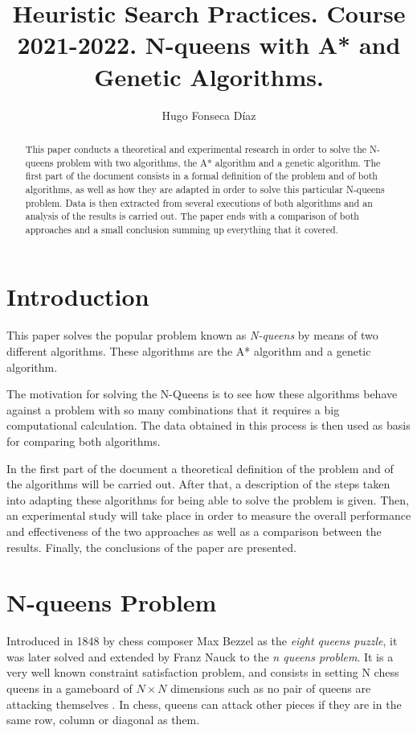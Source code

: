 \documentclass[]{llncs}
\begin{document}
\title{Heuristic Search Practices. Course 2021-2022. N-queens with A* and Genetic Algorithms.}
\author{Hugo Fonseca Díaz\\ }
\maketitle
\begin{abstract}
    This paper conducts a theoretical and experimental research in order to solve the N-queens problem with two algorithms, the A* algorithm and a genetic algorithm. The first part of the document consists in a formal definition of the problem and of both algorithms, as well as how they are adapted in order to solve this particular N-queens problem. Data is then extracted from several executions of both algorithms and an analysis of the results is carried out. The paper ends with a comparison of both approaches and a small conclusion summing up everything that it covered. 
\end{abstract}
\section{Introduction}\label{introduction}
This paper solves the popular problem known as \textit{N-queens} by means of two different algorithms. These algorithms are the A* algorithm and a genetic algorithm. 

The motivation for solving the N-Queens is to see how these algorithms behave against a problem with so many combinations that it requires a big computational calculation. The data obtained in this process is then used as basis for comparing both algorithms.

In the first part of the document a theoretical definition of the problem and of the algorithms will be carried out. After that, a description of the steps taken into adapting these algorithms for being able to solve the problem is given. Then, an experimental study will take place in order to measure the overall performance and effectiveness of the two approaches as well as a comparison between the results. Finally, the conclusions of the paper are presented.
\section{N-queens Problem}\label{nqueens_problem}
Introduced in 1848 by chess composer Max Bezzel as the \textit{eight queens puzzle}, it was later solved and extended by Franz Nauck to the \textit{n queens problem}. It is a very well known constraint satisfaction problem, and consists in setting N chess queens in a gameboard of $N \times N$ dimensions such as no pair of queens are attacking themselves \cite{inteligencia-artificial}. In chess, queens can attack other pieces if they are in the same row, column or diagonal as them.
\end{document}
